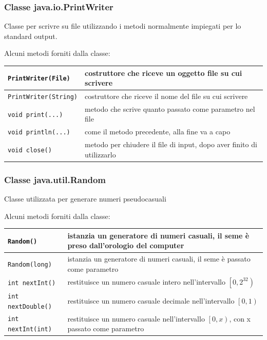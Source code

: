 \documentclass[a4paper]{article}
\begin{document}
\newpage


\subsubsection*{Classe java.io.PrintWriter}
Classe per scrivre su file utilizzando i metodi normalmente impiegati per lo standard output.

Alcuni metodi forniti dalla classe:
\begin{center}
	\begin{tabularx}{\textwidth}{l X}
		\toprule
		\verb|PrintWriter(File)| & costruttore che riceve un oggetto file su cui scrivere \\
		\midrule
		\verb|PrintWriter(String)| & costruttore che riceve il nome del file su cui scrivere \\
		\midrule
		\verb|void print(...)| & metodo che scrive quanto passato come parametro nel file \\
		\midrule
		\verb|void println(...)| & come il metodo precedente, alla fine va a capo \\
		\midrule
		\verb|void close()| & metodo per chiudere il file di input, dopo aver finito di utilizzarlo \\
		\bottomrule
	\end{tabularx}
\end{center}

\subsubsection*{Classe java.util.Random}
Classe utilizzata per generare numeri pseudocasuali

Alcuni metodi forniti dalla classe:
\begin{center}
	\begin{tabularx}{\textwidth}{l X}
		\toprule
		\verb|Random()| & istanzia un generatore di numeri casuali, il seme è preso dall'orologio del computer \\
		\midrule
		\verb|Random(long)| & istanzia un generatore di numeri casuali, il seme è passato come parametro \\
		\midrule
		\verb|int nextInt()| & restituisce un numero casuale intero nell'intervallo \(\left[0, 2^{32}\right)\) \\
		\midrule
		\verb|int nextDouble()| & restituisce un numero casuale decimale nell'intervallo \(\left[0, 1\right)\)\\
		\midrule
		\verb|int nextInt(int)| & restituisce un numero casuale nell'intervallo \(\left[0, x\right)\), con x passato come parametro \\
		\bottomrule
	\end{tabularx}
\end{center}
\end{document}
